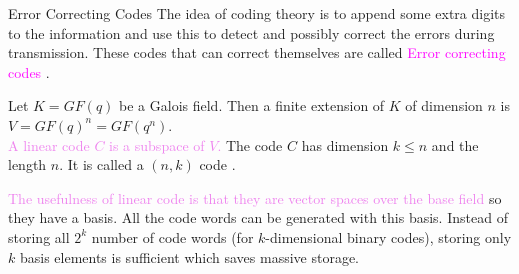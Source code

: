 \documentclass{beamer}
\begin{document}
\begin{frame}{Error Correcting Codes}
  The idea of coding theory is to append some extra digits to the information and use this to detect and possibly correct the errors during transmission.  These codes \textcolor{green!50!black}{that can correct themselves are called} \textcolor{magenta}{Error correcting codes} \cite{coding}.
  \vspace{3mm}


\begin{definition}
Let \(K=GF(q)\) be a Galois field. Then a finite extension of \(K\) of dimension \(n\) is \(V=GF(q)^n=GF(q^n)\).\\
  \textcolor{violet}{A linear code \(C\) is a subspace of \(V\).} The code \(C\) has dimension \(k \leq n\) and the length \(n\). It is called a \((n,k)\) code \cite{error_correct}.
\end{definition}

  \begin{tcolorbox}[colback=white, colframe=blue!40, boxsep=1mm]
\textcolor{violet}{The usefulness of linear code is that they are vector spaces over the base field} so they have a basis. All the code words can be generated with this basis. Instead of storing all \(2^k\) number of code words (for \(k\)-dimensional binary codes), storing only \(k\) basis elements is sufficient which saves massive storage.
\end{tcolorbox}
\end{frame}
\end{document}

